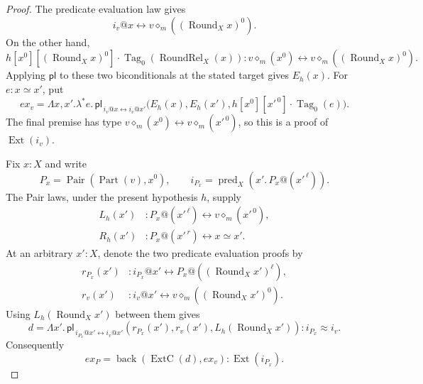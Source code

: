 \begin{proof}
The predicate evaluation law gives
\[
 i_v@x\leftrightarrow
      v\diamond_m((\operatorname{Round}_Xx)^0).
\]
On the other hand,
\[
 h[x^0][(\operatorname{Round}_Xx)^0]\cdot
       \operatorname{Tag}_0(\operatorname{RoundRel}_X(x))
 :v\diamond_m(x^0)\leftrightarrow
      v\diamond_m((\operatorname{Round}_Xx)^0).
\]
Applying $\mathsf{pl}$ to these two biconditionals at the stated
target gives $E_h(x)$.  For $e:x\simeq x'$, put
\[
 ex_v=\Lambda x,x'.\lambda^*e.\,
 \mathsf{pl}_{\,i_v@x\leftrightarrow i_v@x'}
 \bigl(E_h(x),E_h(x'),
       h[x^0][x'^{\,0}]\cdot\operatorname{Tag}_0(e)\bigr).
\]
The final premise has type
$v\diamond_m(x^0)\leftrightarrow v\diamond_m(x'^{\,0})$,
so this is a proof of $\operatorname{Ext}(i_v)$.

Fix $x:X$ and write
\[
 P_x=\operatorname{Pair}(\operatorname{Part}(v),x^0),
 \qquad
 i_{P_x}=\operatorname{pred}_X(x'.\,P_x@(x'^{\,\ell})).
\]
The Pair laws, under the present hypothesis $h$, supply
\begin{align*}
 L_h(x')&:P_x@(x'^{\,\ell})
                  \leftrightarrow v\diamond_m(x'^{\,0}),\\
 R_h(x')&:P_x@(x'^{\,r})\leftrightarrow x\simeq x'.
\end{align*}
At an arbitrary $x':X$, denote the two predicate evaluation proofs by
\begin{align*}
 r_{P_x}(x')&:i_{P_x}@x'
              \leftrightarrow P_x@((\operatorname{Round}_Xx')^\ell),\\
 r_v(x')&:i_v@x'
              \leftrightarrow v\diamond_m((\operatorname{Round}_Xx')^0).
\end{align*}
Using $L_h(\operatorname{Round}_Xx')$ between them gives
\[
 d=\Lambda x'.\,
      \mathsf{pl}_{\,i_{P_x}@x'\leftrightarrow i_v@x'}
      (r_{P_x}(x'),r_v(x'),
       L_h(\operatorname{Round}_Xx'))
      :i_{P_x}\approx i_v.
\]
Consequently
\[
 ex_P=\operatorname{back}(\operatorname{ExtC}(d),ex_v)
       :\operatorname{Ext}(i_{P_x}).
\]


\end{proof}
